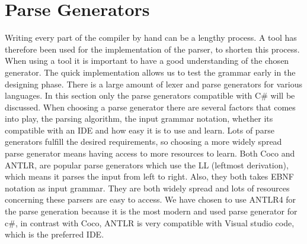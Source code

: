 \section{Parse Generators}
Writing every part of the compiler by hand can be a lengthy process. A tool has therefore been used for the implementation of the parser, to shorten this process. When using a tool it is important to have a good understanding of the chosen generator. The quick implementation allows us to test the grammar early in the designing phase.
There is a large amount of lexer and parse generators for various languages. In this section only the parse generators compatible with C# 
will be discussed. When choosing a parse generator there are several factors that comes into play, the parsing algorithm, the input grammar notation,
whether its compatible with an IDE and how easy it is to use and learn. Lots of parse generators fulfill the desired requirements, 
so choosing a more widely spread parse generator means having access to more resources to learn. Both Coco and ANTLR, are popular parse generators which use the LL (leftmost derivation), which means it parses the input from left to right. 
Also, they both takes EBNF notation as input grammar. They are both widely spread and lots of resources concerning these parsers are easy to access. \newline
We have chosen to use ANTLR4 for the parse generation because it is the most modern and used parse generator for c#, in contrast with Coco, ANTLR is very compatible with Visual studio code, which is the preferred IDE. 
